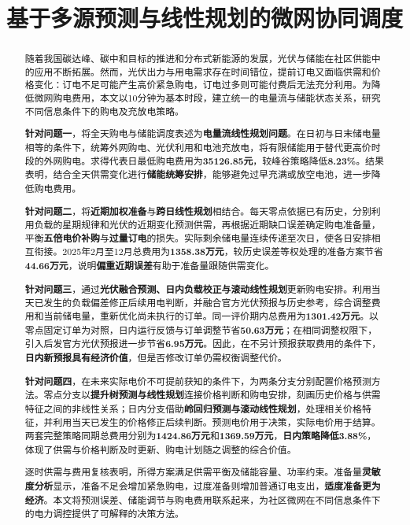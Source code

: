 \title{基于多源预测与线性规划的微网协同调度}
\date{}
\maketitle
\begingroup
{}
\begin{abstract}
\noindent\hspace*{2em}随着我国碳达峰、碳中和目标的推进和分布式新能源的发展，光伏与储能在社区供能中的应用不断拓展。然而，光伏出力与用电需求存在时间错位，提前订电又面临供需和价格变化：订电不足可能产生高价紧急购电，订电过多则可能付费后无法充分利用。为降低微网购电费用，本文以10分钟为基本时段，建立统一的电量流与储能状态关系，研究不同信息条件下的购电及充放电策略。

\textbf{针对问题一}，将全天购电与储能调度表述为\textbf{电量流线性规划问题}。在日初与日末储电量相等的条件下，统筹外网购电、光伏利用和电池充放电，将有限储能用于替代更高价时段的外网购电。求得代表日最低购电费用为\textbf{35126.85元}，较峰谷策略降低\textbf{8.23\%}。结果表明，结合全天供需变化进行\textbf{储能统筹安排}，能够避免过早充满或放空电池，进一步降低购电费用。

\textbf{针对问题二}，将\textbf{近期加权准备}与\textbf{跨日线性规划}相结合。每天零点依据已有历史，分别利用负载的星期规律和光伏的近期变化预测供需，再根据近期缺口误差确定购电准备量，平衡\textbf{五倍电价补购}与\textbf{过量订电}的损失。实际剩余储电量连续传递至次日，使各日安排相互衔接。2025年2月至12月总费用为\textbf{1358.38万元}，较历史误差等权处理的准备方案节省\textbf{44.66万元}，说明\textbf{偏重近期误差}有助于准备量跟随供需变化。

\textbf{针对问题三}，通过\textbf{光伏融合预测、日内负载校正与滚动线性规划}更新购电安排。利用当天已发生的负载偏差修正后续用电判断，并融合官方光伏预报与历史参考，综合调整费用和当前储电量，重新优化尚未执行的订单。同一评价期内总费用为\textbf{1301.42万元}。以零点固定订单为对照，日内运行反馈与订单调整节省\textbf{50.63万元}；在相同调整权限下，引入后发官方光伏预报进一步节省\textbf{6.95万元}。因此，在不另计预报获取费用的条件下，\textbf{日内新预报具有经济价值}，但是否修改订单仍需权衡调整代价。

\textbf{针对问题四}，在未来实际电价不可提前获知的条件下，为两条分支分别配置价格预测方法。零点分支以\textbf{提升树预测与线性规划}连接价格判断和购电安排，刻画历史价格与供需特征之间的非线性关系；日内分支借助\textbf{岭回归预测与滚动线性规划}，处理相关价格特征，并利用当天已发生的价格修正后续判断。预测电价用于决策，实际电价用于结算。两套完整策略同期总费用分别为\textbf{1424.86万元}和\textbf{1369.59万元}，\textbf{日内策略降低3.88\%}，体现了供需与价格判断及时更新、购电计划随之调整的综合价值。

逐时供需与费用复核表明，所得方案满足供需平衡及储能容量、功率约束。准备量\textbf{灵敏度分析}显示，准备不足会增加紧急购电，过度准备则增加普通订电支出，\textbf{适度准备更为经济}。本文将预测误差、储能调节与购电费用联系起来，为社区微网在不同信息条件下的电力调控提供了可解释的决策方法。
\end{abstract}
\par
\endgroup
